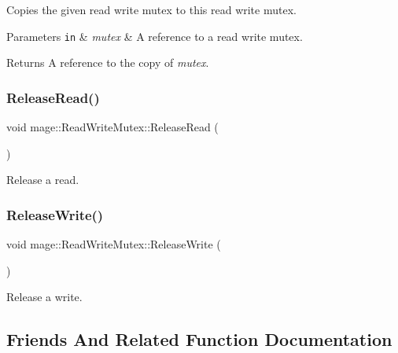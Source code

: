 Copies the given read write mutex to this read write mutex.


\begin{DoxyParams}[1]{Parameters}
\mbox{\tt in}  & {\em mutex} & A reference to a read write mutex. \\
\hline
\end{DoxyParams}
\begin{DoxyReturn}{Returns}
A reference to the copy of {\itshape mutex}. 
\end{DoxyReturn}
\hypertarget{classmage_1_1_read_write_mutex_a0af5059a9bd16abd8a21b15e7ebe053d}{}\label{classmage_1_1_read_write_mutex_a0af5059a9bd16abd8a21b15e7ebe053d} 
\subsubsection{\texorpdfstring{Release\+Read()}{ReleaseRead()}}
{\footnotesize\ttfamily void mage\+::\+Read\+Write\+Mutex\+::\+Release\+Read (\begin{DoxyParamCaption}{ }\end{DoxyParamCaption})\hspace{0.3cm}{\ttfamily [private]}}

Release a read. \hypertarget{classmage_1_1_read_write_mutex_ad0fd296bdaa212f54a58372c8dfe1d1d}{}\label{classmage_1_1_read_write_mutex_ad0fd296bdaa212f54a58372c8dfe1d1d} 
\subsubsection{\texorpdfstring{Release\+Write()}{ReleaseWrite()}}
{\footnotesize\ttfamily void mage\+::\+Read\+Write\+Mutex\+::\+Release\+Write (\begin{DoxyParamCaption}{ }\end{DoxyParamCaption})\hspace{0.3cm}{\ttfamily [private]}}

Release a write. 

\subsection{Friends And Related Function Documentation}
\hypertarget{classmage_1_1_read_write_mutex_a7ae207fc659160d3c55a5ba1468007f7}{}\label{classmage_1_1_read_write_mutex_a7ae207fc659160d3c55a5ba1468007f7} 
